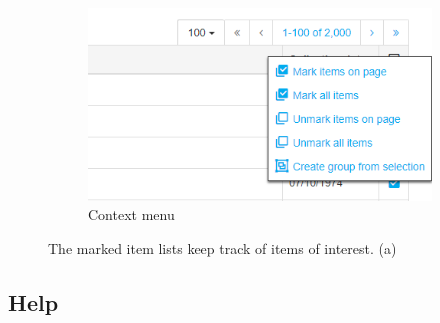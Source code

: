 \begin{figure}
	\begin{subfigure}[b]{0.2\linewidth}
		\includegraphics[width=1\linewidth]{img/features/item-list-context-create-group.png}
		\caption{Context menu}
		\label{fig:features:marked-items-context}
	\end{subfigure}
	\caption{The marked item lists keep track of items of interest. (a) }
\end{figure}


\subsection{Help}
\label{sec:features:help}